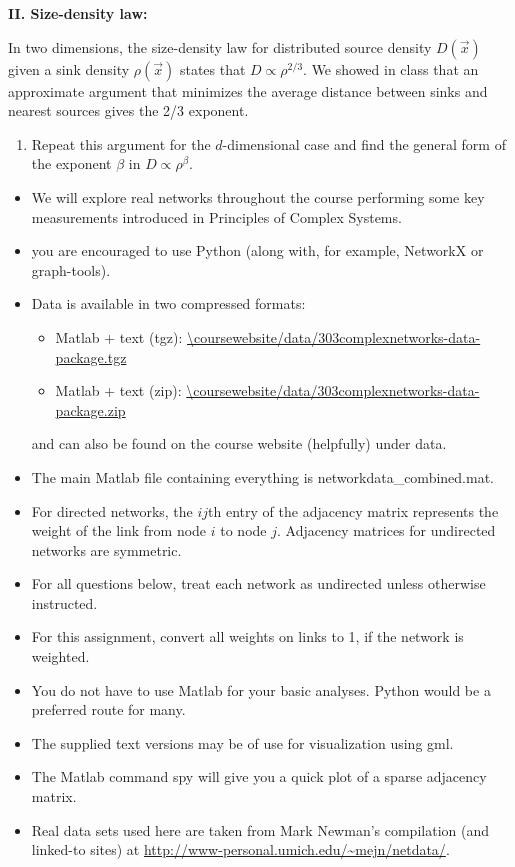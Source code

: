 \textbf{II. Size-density law:}

In two dimensions, the size-density law for distributed source density $D(\vec{x})$
given a sink density $\rho(\vec{x})$ states that $D \propto \rho^{2/3}$.
We showed in class that an approximate argument that minimizes the 
average distance between sinks and nearest sources gives the 2/3 exponent.

\begin{enumerate}

\item Repeat this argument for the $d$-dimensional case and find
  the general form of the exponent $\beta$ in $D \propto \rho^{\beta}$.

  
   \solutionstart


   \solutionend


\end{enumerate}

\begin{itemize}
\item 
  We will explore real networks throughout
  the course
  performing some key measurements introduced
  in Principles of Complex Systems.
\item

  you are encouraged to use Python
  (along with, for example, NetworkX or graph-tools).
\item
  Data is available in two compressed formats:
  \begin{itemize}
  \item 
    Matlab + text (tgz): \url{\coursewebsite/data/303complexnetworks-data-package.tgz}
  \item 
    Matlab + text (zip): \url{\coursewebsite/data/303complexnetworks-data-package.zip}
  \end{itemize}
  and can also be found on the course website (helpfully) under data.
\item
  The main Matlab file containing everything is networkdata\_{c}ombined.mat.
\item
  For directed networks, the $ij$th entry of the adjacency matrix
  represents the weight of the link from node $i$ to node $j$.
  Adjacency matrices for undirected networks are symmetric.
\item
  For all questions below, 
  treat each network as undirected unless otherwise instructed.
\item
  For this assignment, convert all weights on
  links to 1, if the network is weighted.
\item 
  You do not have to use Matlab for your basic
  analyses.
  Python would be a preferred route for many.
\item 
  The supplied text versions may be of
  use for visualization using gml.
\item
  The Matlab command spy will give you a quick plot
  of a sparse adjacency matrix.
\item
  Real data sets used here are taken
  from Mark Newman's compilation (and linked-to sites) at
  \url{http://www-personal.umich.edu/~mejn/netdata/}.
\end{itemize}


